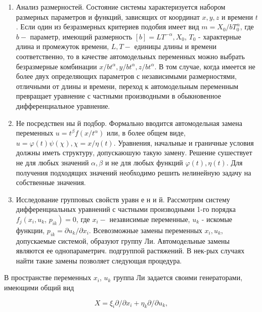\documentclass[10pt]{article}
\begin{document}
\begin{enumerate}

  \item Анализ размерностей. Состояние системы характеризуется набором размерных параметров и функций, зависящих от координат $x, y, z$ и времени $t$. Если один из безразмерных критериев подобия имеет вид $m=X_{0} / b T_{0}^{\alpha}$, где $b-$ параметр, имеющий размерность $[b]=L T^{-\alpha}, X_{0}$, $T_{0}$ - характерные длина и промежуток времени, $L, T-$ единицы длины и времени соответственно, то в качестве автомодельных переменных можно выбрать безразмерные комбинации $x / b t^{\alpha}, y / b t^{\alpha}, z / b t^{\alpha}$. В том случае, когда имеется не более двух определяющих параметров с независимыми размерностями, отличными от длины и времени, переход к автомодельным переменным превращает уравнение с частными производными в обыкновенное дифференциальное уравнение.



  \item Не посредствен ны й подбор. Формально вводится автомодельная замена переменных $u=t^{\beta} f\left(x / t^{\alpha}\right)$ или, в более общем виде, $u=\varphi(t) \psi(\chi), \chi=x / \eta(t)$. Уравнения, начальные и граничные условия должны иметь структуру, допускаюшую такую замену. Решение сушествует не для любых значений $\alpha, \beta$ и не для любых функций $\varphi(t), \eta(t)$. Для получения подходящих значений необходимо решить нелинейную задачу на собственные значения.



  \item Исследование групповых свойств уравн е н и й. Рассмотрим систему дифференциальных уравнений с частными производными 1-го порядка $f_{j}\left(x_{i}, u_{k}\right.$, $\left.p_{i k}\right)=0$, где $x_{i}-$ независимые переменные, $u_{k}$ - искомые функции, $p_{i k}=\partial u_{k} / \partial x_{i}$. Всевозможные замены переменных $x_{i}, u_{k}$, допускаемые системой, образуют группу Ли. Автомодельные замены являются ее однопараметрич. подгруппой растяжений. В нек-рых случаях найти такие замены позволяет следующая процедура.



\end{enumerate}



В пространстве переменных $x_{i}$, $u_{k}$ группа Ли задается своими генераторами, имеющими общий вид



\[

X=\xi_{i} \partial / \partial x_{i}+\eta_{k} \partial / \partial u_{k},

\]
\end{document}
